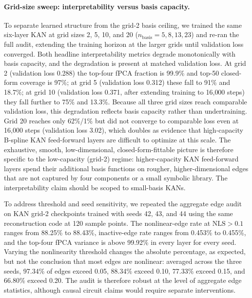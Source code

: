 \documentclass[11pt]{article}
\newcommand{\nls}{\mathrm{NLS}}
\begin{document}
\paragraph{Grid-size sweep: interpretability versus basis capacity.}
\label{sec:gridsweep}
To separate learned structure from the grid-2 basis ceiling, we trained the same six-layer KAN at grid sizes 2, 5, 10, and 20 (\(n_{\mathrm{basis}}=5,8,13,23\)) and re-ran the full audit, extending the training horizon at the larger grids until validation loss converged. Both headline interpretability metrics degrade monotonically with basis capacity, and the degradation is present at matched validation loss. At grid 2 (validation loss 0.288) the top-four fPCA fraction is 99.9\% and top-50 closed-form coverage is 97\%; at grid 5 (validation loss 0.312) these fall to 91\% and 18.7\%; at grid 10 (validation loss 0.371, after extending training to 16{,}000 steps) they fall further to 75\% and 13.3\%. Because all three grid sizes reach comparable validation loss, this degradation reflects basis capacity rather than undertraining. Grid 20 reaches only 62\%/1\% but did not converge to comparable loss even at 16{,}000 steps (validation loss 3.02), which doubles as evidence that high-capacity B-spline KAN feed-forward layers are difficult to optimize at this scale. The exhaustive, smooth, low-dimensional, closed-form-fittable picture is therefore specific to the low-capacity (grid-2) regime: higher-capacity KAN feed-forward layers spend their additional basis functions on rougher, higher-dimensional edges that are not captured by four components or a small symbolic library. The interpretability claim should be scoped to small-basis KANs.

To address threshold and seed sensitivity, we repeated the aggregate edge audit on KAN grid-2 checkpoints trained with seeds 42, 43, and 44 using the same reconstruction code at 120 sample points. The nonlinear-edge rate at \(\nls>0.1\) ranges from 88.25\% to 88.43\%, inactive-edge rate ranges from 0.453\% to 0.455\%, and the top-four fPCA variance is above 99.92\% in every layer for every seed. Varying the nonlinearity threshold changes the absolute percentage, as expected, but not the conclusion that most edges are nonlinear: averaged across the three seeds, 97.34\% of edges exceed 0.05, 88.34\% exceed 0.10, 77.33\% exceed 0.15, and 66.80\% exceed 0.20. The audit is therefore robust at the level of aggregate edge statistics, although causal circuit claims would require separate interventions.
\end{document}

